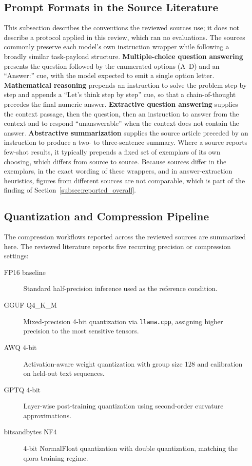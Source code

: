 \subsection{Prompt Formats in the Source Literature}
\label{subsec:appendix_prompt_templates}
This subsection describes the conventions the reviewed sources use; it does not
describe a protocol applied in this review, which ran no evaluations. The sources
commonly preserve each model's own instruction wrapper while following a broadly
similar task-payload structure. \textbf{Multiple-choice question answering} presents the question
followed by the enumerated options (A--D) and an ``Answer:'' cue, with the model
expected to emit a single option letter. \textbf{Mathematical reasoning} prepends
an instruction to solve the problem step by step and appends a ``Let's think step
by step'' cue, so that a chain-of-thought precedes the final numeric answer.
\textbf{Extractive question answering} supplies the context passage, then the
question, then an instruction to answer from the context and to respond
``unanswerable'' when the context does not contain the answer. \textbf{Abstractive
summarization} supplies the source article preceded by an instruction to produce a
two- to three-sentence summary. Where a source reports few-shot results, it typically prepends a fixed set of
exemplars of its own choosing, which differs from source to source. Because
sources differ in the exemplars, in the exact wording of these wrappers, and in
answer-extraction heuristics, figures from different sources are not comparable,
which is part of the finding of Section~\ref{subsec:reported_overall}.

\subsection{Quantization and Compression Pipeline}
\label{subsec:appendix_quantization_pipeline}
The compression workflows reported across the reviewed sources are summarized here. The reviewed literature reports five recurring precision or compression settings:
\begin{description}
    \item[FP16 baseline] Standard half-precision inference used as the reference condition.
    \item[GGUF Q4\_K\_M] Mixed-precision 4-bit quantization via \texttt{llama.cpp}, assigning higher precision to the most sensitive tensors.
    \item[AWQ 4-bit] Activation-aware weight quantization with group size 128 and calibration on held-out text sequences.
    \item[GPTQ 4-bit] Layer-wise post-training quantization using second-order curvature approximations.
    \item[bitsandbytes NF4] 4-bit NormalFloat quantization with double quantization, matching the \gls{qlora} training regime.
\end{description}

